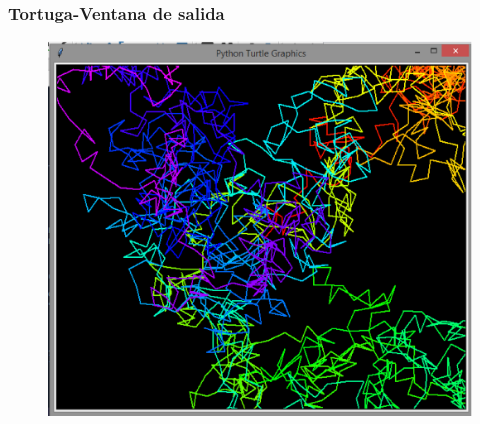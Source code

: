 \documentclass[12pt]{beamer}
\begin{document}
\begin{frame}
\frametitle{Tortuga-Ventana de salida}
\begin{figure}
	\centering
	\includegraphics[scale=0.3]{Imagenes/caminataAleatoria_Python_01.eps}
\end{figure}
\end{frame}
\end{document}
